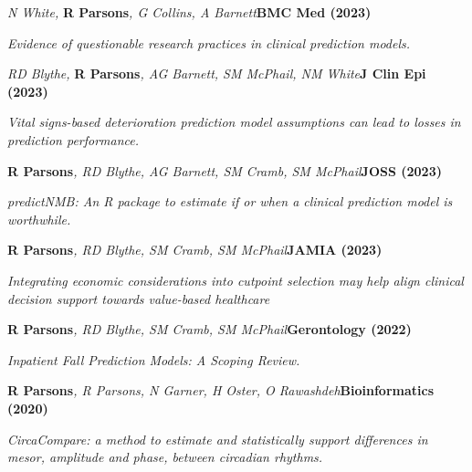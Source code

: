 \item
    \textit{N White, }\textbf{R Parsons}\textit{, G Collins, A Barnett}\textbf{\hfill{BMC Med (2023)}}\par
    \textit{Evidence of questionable research practices in clinical prediction models.}
\item
    \textit{RD Blythe, }\textbf{R Parsons}\textit{, AG Barnett, SM McPhail, NM White}\textbf{\hfill{J Clin Epi (2023)}}\par
    \textit{Vital signs-based deterioration prediction model assumptions can lead to losses in prediction performance.}
\item
    \textbf{R Parsons}\textit{, RD Blythe, AG Barnett, SM Cramb, SM McPhail}\textbf{\hfill{JOSS (2023)}}\par
    \textit{predictNMB: An R package to estimate if or when a clinical prediction model is worthwhile.}
\item
    \textbf{R Parsons}\textit{, RD Blythe, SM Cramb, SM McPhail}\textbf{\hfill{JAMIA (2023)}}\par
    \textit{
        Integrating economic considerations into cutpoint selection may help align clinical decision support \newline
        towards value-based healthcare
    }
\item
    \textbf{R Parsons}\textit{, RD Blythe, SM Cramb, SM McPhail}\textbf{\hfill Gerontology (2022)}\par
	\textit{Inpatient Fall Prediction Models: A Scoping Review.}
\item
    \textbf{R Parsons}\textit{, R Parsons, N Garner, H Oster, O Rawashdeh}\textbf{\hfill Bioinformatics (2020)}\par 
    \textit{CircaCompare: a method to estimate and statistically support differences in mesor, amplitude and phase, between circadian rhythms.}
